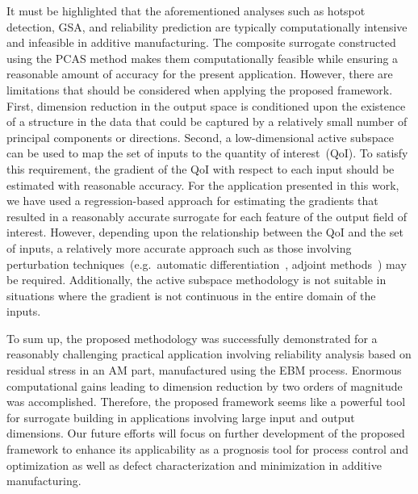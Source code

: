 It must be highlighted that the aforementioned
analyses such as hotspot detection, GSA, and reliability prediction are typically computationally intensive and
infeasible in additive manufacturing.
 The composite surrogate constructed using the PCAS method makes them computationally
feasible while ensuring a reasonable amount of accuracy for the present application.
 However, there are limitations that should be considered
when applying the proposed framework. First, dimension reduction in the output space is conditioned upon the
existence of a structure in the data that could be captured by a relatively small number of principal components or
directions. Second, a low-dimensional active subspace can be used to map the set of inputs to the quantity of
 interest~(QoI).
To satisfy this requirement, the gradient of the QoI with respect to each input should be estimated
with reasonable accuracy. For the application presented in this work, we have used a regression-based approach for 
estimating the gradients that resulted in a reasonably accurate surrogate for each feature of the output field of interest.
However, depending upon the relationship between the QoI and the set of inputs, a relatively more accurate approach
such as those involving perturbation techniques~(e.g.~automatic differentiation~\cite{Kiparissides:2009}, adjoint 
methods~\cite{Borzi:2011, Alexanderian:2017}) may be required. Additionally, the active subspace methodology is
not suitable in situations where the gradient is not continuous in the entire domain of the inputs.

To sum up, the proposed methodology was successfully demonstrated for a reasonably challenging practical
application involving reliability analysis based on residual stress in an AM part, manufactured using the EBM process. 
Enormous computational gains leading to dimension reduction by two orders of magnitude was accomplished. Therefore,
the proposed framework seems like a powerful tool for surrogate building in applications involving large input and
output dimensions. Our future efforts will focus on further development of the proposed framework to enhance its
applicability as a prognosis tool for process control and optimization as well as defect characterization and minimization in 
additive manufacturing.

























